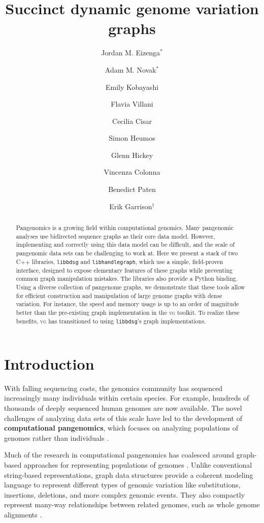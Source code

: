 \documentclass{article}
\title{Succinct dynamic genome variation graphs} %
\author{Jordan M. Eizenga$^*$
  \and Adam M. Novak$^*$
  \and Emily Kobayashi
  \and Flavia Villani
  \and Cecilia Cisar
  \and Simon Heumos
  \and Glenn Hickey
  \and Vincenza Colonna
  \and Benedict Paten
  \and Erik Garrison$^\dagger$}
\newcommand{\vocab}{\textbf}
\begin{document}
\maketitle

\begin{abstract}

Pangenomics is a growing field within computational genomics.
Many pangenomic analyses use bidirected sequence graphs as their core data model.
However, implementing and correctly using this data model can be difficult, and the scale of pangenomic data sets can be challenging to work at.
Here we present a stack of two C++ libraries, \texttt{libbdsg} and \texttt{libhandlegraph}, which use a simple, field-proven interface, designed to expose elementary features of these graphs while preventing common graph manipulation mistakes.
The libraries also provide a Python binding.
Using a diverse collection of pangenome graphs, we demonstrate that these tools allow for efficient construction and manipulation of large genome graphs with dense variation.
For instance, the speed and memory usage is up to an order of magnitude better than the pre-existing graph implementation in the \textsc{vg} toolkit.
To realize these benefits, \textsc{vg} has transitioned to using \texttt{libbdsg}'s graph implementations.

\end{abstract}

\section{Introduction}


With falling sequencing costs, the genomics community has sequenced increasingly many individuals within certain species.
For example, hundreds of thousands of deeply sequenced human genomes are now available.
The novel challenges of analyzing data sets of this scale have led to the development of \vocab{computational pangenomics}, which focuses on analyzing populations of genomes rather than individuals \cite{computational2016computational}.

Much of the research in computational pangenomics has coalesced around graph-based approaches for representing populations of genomes \cite{Paten_2017}.
Unlike conventional string-based representations, graph data structures provide a coherent modeling language to represent different types of genomic variation like substitutions, insertions, deletions, and more complex genomic events.
They also compactly represent many-way relationships between related genomes, such as whole genome alignments \cite{kehr2014genome}.
\end{document}
